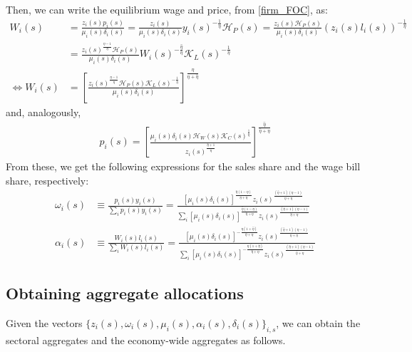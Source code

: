 \documentclass[12pt]{article}%
\begin{document}
Then, we can write the equilibrium wage and price, from \eqref{firm_FOC}, as:
\begin{align*}
    W_i(s) &= \frac{z_i(s) p_i(s)}{\mu_i(s) \delta_i(s)} = \frac{z_i(s)}{\mu_i(s) \delta_i(s)} y_i(s)^{-\frac{1}{\eta}} \mathcal{H}_P(s) = \frac{z_i(s) \mathcal{H}_P(s)}{\mu_i(s) \delta_i(s)} (z_i(s)l_i(s))^{-\frac{1}{\eta}}  \\
    & = \frac{z_i(s)^{\frac{\eta - 1}{\eta}} \mathcal{H}_P(s)}{\mu_i(s) \delta_i(s)} W_i(s)^{-\frac{\hat{\eta}}{\eta}} \mathcal{K}_L(s)^{-\frac{1}{\eta}} \\
    \iff W_i(s) &= \left[ \frac{z_i(s)^{\frac{\eta-1}{\eta}} \mathcal{H}_P(s) \mathcal{K}_L(s)^{-\frac{1}{\eta}}}{\mu_i(s) \delta_i(s)} \right]^{\frac{\eta}{\eta + \hat{\eta}}} 
\end{align*}
and, analogously,
\begin{align*}
    p_i(s) = \left[ \frac{\mu_i(s) \delta_i(s) \mathcal{H}_W(s) \mathcal{K}_C(s)^{\frac{1}{\hat{\eta}}}}{z_i(s) ^{\frac{\hat{\eta} + 1}{\hat{\eta}}}} \right]^{\frac{\hat{\eta}}{\hat{\eta} + \eta}}
\end{align*}
From these, we get the following expressions for the sales share and the wage bill share, respectively:
\begin{align*}
    \omega_i(s) & \equiv \frac{p_i(s) y_i(s)}{\sum_i p_i(s) y_i(s)} = \frac{ [\mu_i(s)\delta_i(s)]^{\frac{\hat{\eta} (1 - \eta)}{\hat{\eta} + \eta}} z_i(s)^{\frac{(\hat{\eta} + 1)(\eta - 1)}{\hat{\eta} + \eta}} }{ \sum_i [\mu_i(s)\delta_i(s)]^{\frac{\hat{\eta} (1 - \eta)}{\hat{\eta} + \eta}} z_i(s)^{\frac{(\hat{\eta} + 1)(\eta - 1)}{\hat{\eta} + \eta}} }\\
    \alpha_i(s) & \equiv \frac{W_i(s)l_i(s)}{\sum_i W_i(s) l_i(s)} = \frac{ [\mu_i(s) \delta_i(s)] ^{-\frac{\eta (1+\hat{\eta})}{\hat{\eta}+\eta}} z_i(s)^{\frac{(\hat{\eta} + 1)(\eta-1)}{\hat{\eta}+\eta}} }{ \sum_i [\mu_i(s) \delta_i(s)] ^{-\frac{\eta (1+\hat{\eta})}{\hat{\eta}+\eta}} z_i(s)^{\frac{(\hat{\eta} + 1)(\eta-1)}{\hat{\eta}+\eta}} }
\end{align*}

\subsection{Obtaining aggregate allocations} \label{appendix_aggregates}
Given the vectors $\{z_i(s), \omega_i(s), \mu_i(s), \alpha_i(s), \delta_i(s)\}_{i,s}$, we can obtain the sectoral aggregates and the economy-wide aggregates as follows.
\end{document}
